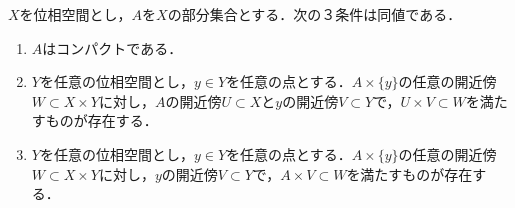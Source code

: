 \documentclass[uplatex,dvipdfmx]{jsreport}
\begin{document}
\begin{proposition}[コンパクト性の積位相の言葉による特徴付け]\label{prop-characterization-of-compactness-in-terms-of-product-topology}
    $X$を位相空間とし，$A$を$X$の部分集合とする．次の３条件は同値である．
    \begin{enumerate}
        \item $A$はコンパクトである．
        \item $Y$を任意の位相空間とし，$y\in Y$を任意の点とする．$A\times\{y\}$の任意の開近傍$W\subset X\times Y$に対し，$A$の開近傍$U\subset X$と$y$の開近傍$V\subset Y$で，$U\times V\subset W$を満たすものが存在する．
        \item $Y$を任意の位相空間とし，$y\in Y$を任意の点とする．$A\times\{y\}$の任意の開近傍$W\subset X\times Y$に対し，$y$の開近傍$V\subset Y$で，$A\times V\subset W$を満たすものが存在する．
    \end{enumerate}
\end{proposition}
\end{document}
